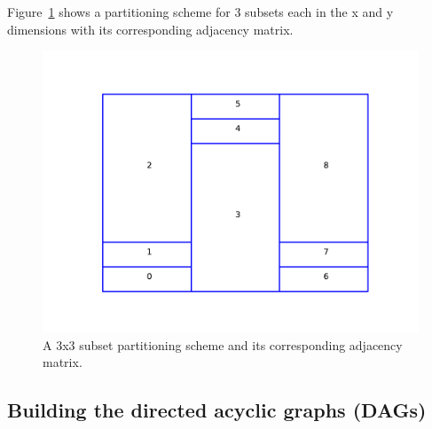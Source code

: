 Figure~\ref{25basematrix} shows a partitioning scheme for 3 subsets each in the x and y dimensions with its corresponding adjacency matrix.

\begin{figure}[H]
\begin{minipage}[c]{0.5\textwidth}
\centering
\includegraphics[scale=0.7]{../../figures/boundaries_worst.pdf}
\end{minipage}
\begin{minipage}[c]{0.6\textwidth}
\centering
{}
\end{minipage}
\caption{A 3x3 subset partitioning scheme and its corresponding adjacency matrix.}
\label{25basematrix}
\end{figure}

\subsection{Building the directed acyclic graphs (DAGs)}

